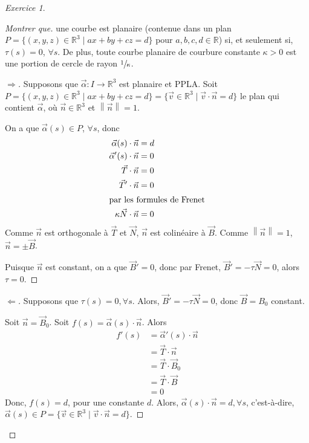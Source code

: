 \documentclass{report}
\theoremstyle{definition}
\theoremstyle{remark}
\newtheorem*{exer}{Exercice}
\newenvironment*{subproof}[1][D\'emonstration]
{
\begin{proof}[#1]

}
{
\renewcommand{\qedsymbol}{$\blacksquare$}
\end{proof}
\renewcommand{\qedsymbol}{$\square$}
}
\def\RR{\mathbb{R}}
\newcommand*{\norme}[1]{\left\|#1\right\|}
\begin{document}
	\begin{exer}
		\begin{proof}[Montrer que]
			une courbe est planaire (contenue dans un plan $P=\{(x,y,z)\in\RR^3 \mid ax+by+cz=d\}$ pour  $a,b,c,d\in\RR$) si, et seulement si, $\tau(s)=0$, $\forall s$. De plus, toute courbe planaire de courbure constante $\kappa>0$ est une portion de cercle de rayon $\sfrac{1}{\kappa}$.
			\begin{subproof}[$\Rightarrow$]
				Supposons que $\vec\alpha:I\to\RR^3$ est planaire et PPLA. Soit $P=\{(x,y,z)\in\RR^3 \mid ax+by+cz=d\} = \{\vec v\in\RR^3 \mid \vec v \cdot \vec n=d\}$ le plan qui contient $\vec\alpha$, o\`u $\vec n\in\RR^3$ et $\norme{\vec n}=1$.

				On a que $\vec\alpha(s)\in P$, $\forall s$, donc
				\begin{align*}
					\vec\alpha(s) \cdot \vec n&= d\\
					\vec\alpha'(s) \cdot \vec n&= 0\\
					\vec T \cdot \vec n&= 0\\
					\vec T' \cdot \vec n&= 0\\
					\shortintertext{par les formules de Frenet}
					\kappa\vec N \cdot \vec n&= 0
				\end{align*}
				Comme $\vec n$ est orthogonale \`a $\vec T$ et $\vec N$, $\vec n$ est colin\'eaire \`a $\vec B$. Comme $\norme{\vec n}=1$, $\vec n = \pm\vec B$.

				Puisque $\vec n$ est constant, on a que $\vec B'=0$, donc par Frenet, $\vec B'=-\tau\vec N=0$, alors $\tau=0$.
			\end{subproof}
			\begin{subproof}[$\Leftarrow$]
				Supposons que $\tau(s)=0, \forall s$. Alors, $\vec B'=-\tau\vec N=0$, donc $\vec B=B_0$ constant.

				Soit $\vec n=\vec B_0$. Soit $f(s)=\vec\alpha(s) \cdot \vec n$. Alors
				\begin{align*}
					f'(s)&= \vec\alpha'(s) \cdot \vec n\\
					&= \vec T \cdot \vec n\\
					&= \vec T \cdot \vec B_0\\
					&= \vec T \cdot \vec B\\
					&= 0
				\end{align*}
				Donc, $f(s)=d$, pour une constante $d$. Alors, $\vec\alpha(s) \cdot \vec n=d, \forall s$, c'est-\`a-dire, $\vec\alpha(s)\in P=\{\vec v\in\RR^3 \mid \vec v \cdot \vec n=d\}$.
			\end{subproof}


\end{proof}
\end{exer}
\end{document}

